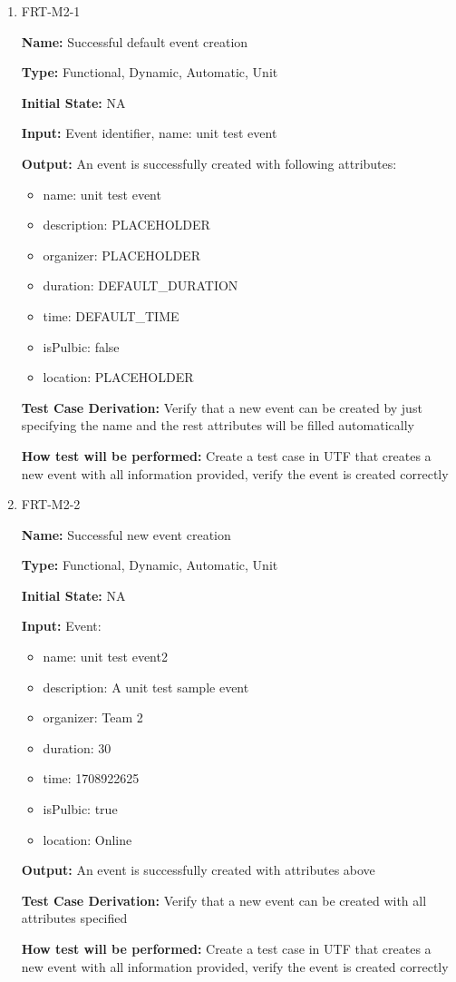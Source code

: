 \documentclass[12pt, titlepage]{article}
\begin{document}
\begin{enumerate}
\item{FRT-M2-1}

\textbf{Name:} Successful default event creation

\textbf{Type:} Functional, Dynamic, Automatic, Unit
					
\textbf{Initial State:} NA
					
\textbf{Input:} Event identifier, name: unit test event
					
\textbf{Output:} An event is successfully created with following attributes:
\begin{itemize}
\item name: unit test event
\item description: PLACEHOLDER
\item organizer: PLACEHOLDER
\item duration: DEFAULT\_DURATION
\item time: DEFAULT\_TIME
\item isPulbic: false
\item location: PLACEHOLDER
\end{itemize}

\textbf{Test Case Derivation:} Verify that a new event can be created by just specifying the name and the rest attributes will be filled automatically

\textbf{How test will be performed:} Create a test case in UTF that creates a new event with all information provided, verify the event is created correctly

\item{FRT-M2-2}

\textbf{Name:} Successful new event creation

\textbf{Type:} Functional, Dynamic, Automatic, Unit
					
\textbf{Initial State:} NA
					
\textbf{Input:} Event:
\begin{itemize}
\item name: unit test event2
\item description: A unit test sample event
\item organizer: Team 2
\item duration: 30
\item time: 1708922625
\item isPulbic: true
\item location: Online
\end{itemize}
					
\textbf{Output:} An event is successfully created with attributes above

\textbf{Test Case Derivation:} Verify that a new event can be created with all attributes specified

\textbf{How test will be performed:} Create a test case in UTF that creates a new event with all information provided, verify the event is created correctly
\end{enumerate}
\end{document}
